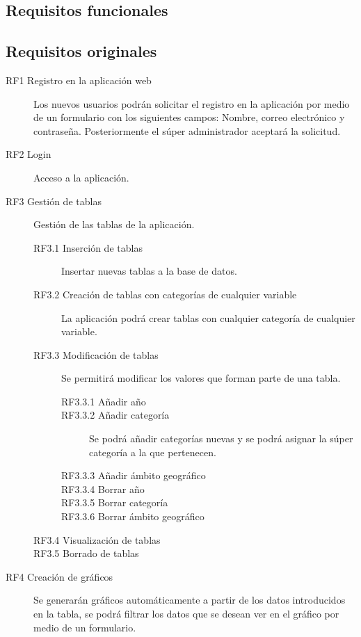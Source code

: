\subsection{Requisitos funcionales}
\subsection{Requisitos originales}
\begin{description}
    \item [RF1 Registro en la aplicación web] Los nuevos usuarios podrán solicitar el registro en la aplicación por medio de un formulario con los siguientes campos: Nombre, correo electrónico y contraseña. Posteriormente el súper administrador aceptará la solicitud.
    \item [RF2 Login] Acceso a la aplicación.
    \item [RF3 Gestión de tablas] Gestión de las tablas de la aplicación.
    \begin{description}
        \item [RF3.1 Inserción de tablas] Insertar nuevas tablas a la base de datos.
        \item [RF3.2 Creación de tablas con categorías de cualquier variable] La aplicación podrá crear tablas con cualquier categoría de cualquier variable.
        \item [RF3.3 Modificación de tablas] Se permitirá modificar los valores que forman parte de una tabla.
        \begin{description}
            \item [RF3.3.1 Añadir año]
            \item [RF3.3.2 Añadir categoría] Se podrá añadir categorías nuevas y se podrá asignar la súper categoría a la que pertenecen.
            \item [RF3.3.3 Añadir ámbito geográfico] 
            \item [RF3.3.4 Borrar año]
            \item [RF3.3.5 Borrar categoría]
            \item [RF3.3.6 Borrar ámbito geográfico]
        \end{description}
        \item [RF3.4 Visualización de tablas]
        \item [RF3.5 Borrado de tablas]
    \end{description}
    \item [RF4 Creación de gráficos] Se generarán gráficos automáticamente a partir de los datos introducidos en la tabla, se podrá filtrar los datos que se desean ver en el gráfico por medio de un formulario.

\end{description}
